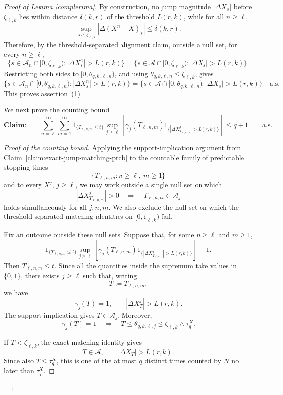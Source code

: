 \documentclass[a4paper,10pt]{article}
\begin{document}
\begin{proof}[Proof of Lemma \ref{complemma}]
By construction, no jump magnitude \(|\Delta X_s|\) before
\(\zeta_{\ell,k}\) lies within distance \(\delta(k,r)\) of the threshold
\(L(r,k)\), while for all \(n\ge \ell\),
\[
\sup_{s<\zeta_{\ell,k}} |\Delta(X^n-X)_s|\le \delta(k,r).
\]
Therefore, by the threshold-separated alignment claim, outside a null
set, for every \(n\ge\ell\),
\[
\{s\in\mathcal A_n\cap[0,\zeta_{\ell,k}):|\Delta X^n_s|>L(r,k)\}
=
\{s\in\mathcal A\cap[0,\zeta_{\ell,k}):|\Delta X_s|>L(r,k)\}.
\]
Restricting both sides to \([0,\theta_{q,k,\ell,n})\), and using
\(\theta_{q,k,\ell,n}\le\zeta_{\ell,k}\), gives
\[
\{s\in \mathcal A_n\cap[0,\theta_{q,k,\ell,n}):|\Delta X^n_s|>L(r,k)\}
=
\{s\in \mathcal A\cap[0,\theta_{q,k,\ell,n}):|\Delta X_s|>L(r,k)\}
\quad\text{a.s.}
\]
This proves assertion~(1).

We next prove the counting bound
\[
\textbf{Claim:}\qquad
\sum_{n=\ell}^{\infty}
\sum_{m=1}^{\infty}
1_{\{T_{\ell,n,m}\le t\}}
\sup_{j\ge\ell}
\left[
\gamma_j(T_{\ell,n,m})
1_{\{|\Delta X^j_{T_{\ell,n,m}}|>L(r,k)\}}
\right]
\le q+1
\qquad\text{a.s.}
\]

\begin{proof}[Proof of the counting bound]
Applying the support-implication argument from
Claim~\ref{claim:exact-jump-matching-prob} to the countable family of
predictable stopping times
\[
        \{T_{\ell,n,m}:n\ge\ell,\ m\ge1\}
\]
and to every \(X^j\), \(j\ge\ell\), we may work outside a single null
set on which
\[
|\Delta X^j_{T_{\ell,n,m}}|>0
\quad\Longrightarrow\quad
T_{\ell,n,m}\in\mathcal A_j
\]
holds simultaneously for all \(j,n,m\). We also exclude the null set
on which the threshold-separated matching identities on
\([0,\zeta_{\ell,k})\) fail.

Fix an outcome outside these null sets. Suppose that, for some
\(n\ge\ell\) and \(m\ge1\),
\[
1_{\{T_{\ell,n,m}\le t\}}
\sup_{j\ge\ell}
\left[
\gamma_j(T_{\ell,n,m})
1_{\{|\Delta X^j_{T_{\ell,n,m}}|>L(r,k)\}}
\right]
=1.
\]
Then \(T_{\ell,n,m}\le t\). Since all the quantities inside the
supremum take values in \(\{0,1\}\), there exists \(j\ge\ell\) such
that, writing
\[
        T:=T_{\ell,n,m},
\]
we have
\[
        \gamma_j(T)=1,
        \qquad
        |\Delta X^j_T|>L(r,k).
\]
The support implication gives \(T\in\mathcal A_j\). Moreover,
\[
\gamma_j(T)=1
\quad\Longrightarrow\quad
T\le\theta_{q,k,\ell,j}
\le
\zeta_{\ell,k}\wedge\tau_q^X.
\]

If \(T<\zeta_{\ell,k}\), the exact matching identity gives
\[
        T\in\mathcal A,
        \qquad
        |\Delta X_T|>L(r,k).
\]
Since also \(T\le\tau_q^X\), this is one of the at most \(q\)
distinct times counted by \(N\) no later than \(\tau_q^X\).


\end{proof}
\end{proof}
\end{document}
